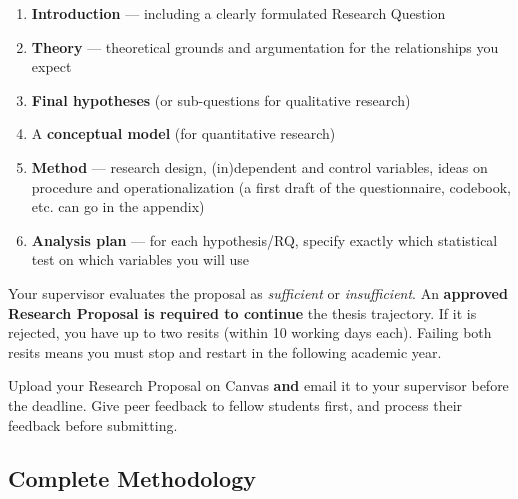 \documentclass[
  11pt,
  a4paper,
]{scrbook}
\providecommand{\tightlist}{%
  \setlength{\itemsep}{0pt}\setlength{\parskip}{0pt}}\usepackage{longtable,booktabs,array}
\begin{document}
\begin{enumerate}
\def\labelenumi{\arabic{enumi}.}
\tightlist
\item
  \textbf{Introduction} --- including a clearly formulated Research
  Question
\item
  \textbf{Theory} --- theoretical grounds and argumentation for the
  relationships you expect
\item
  \textbf{Final hypotheses} (or sub-questions for qualitative research)
\item
  A \textbf{conceptual model} (for quantitative research)
\item
  \textbf{Method} --- research design, (in)dependent and control
  variables, ideas on procedure and operationalization (a first draft of
  the questionnaire, codebook, etc. can go in the appendix)
\item
  \textbf{Analysis plan} --- for each hypothesis/RQ, specify exactly
  which statistical test on which variables you will use
\end{enumerate}

\begin{tcolorbox}[enhanced jigsaw, bottomrule=.15mm, opacityback=0, toprule=.15mm, colframe=quarto-callout-important-color-frame, left=2mm, rightrule=.15mm, title=\textcolor{quarto-callout-important-color}{\faExclamation}\hspace{0.5em}{The Research Proposal is a gate}, colbacktitle=quarto-callout-important-color!10!white, bottomtitle=1mm, colback=white, breakable, toptitle=1mm, titlerule=0mm, leftrule=.75mm, arc=.35mm, opacitybacktitle=0.6, coltitle=black]

Your supervisor evaluates the proposal as \emph{sufficient} or
\emph{insufficient}. An \textbf{approved Research Proposal is required
to continue} the thesis trajectory. If it is rejected, you have up to
two resits (within 10 working days each). Failing both resits means you
must stop and restart in the following academic year.

\end{tcolorbox}

Upload your Research Proposal on Canvas \textbf{and} email it to your
supervisor before the deadline. Give peer feedback to fellow students
first, and process their feedback before submitting.

\subsection{Complete Methodology}\label{complete-methodology}
\end{document}

